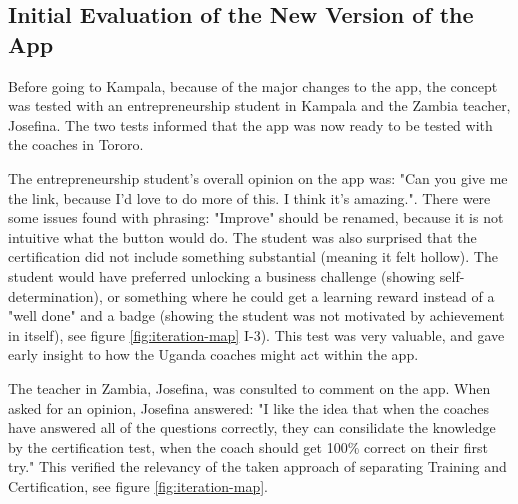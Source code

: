 


  \subsection{Initial Evaluation of the New Version of the App}
  Before going to Kampala, because of the major changes to the app, the concept was tested with an entrepreneurship student in Kampala and the Zambia teacher, Josefina. The two tests informed that the app was now ready to be tested with the coaches in Tororo.

  The entrepreneurship student's overall opinion on the app was: "Can you give me the link, because I'd love to do more of this. I think it's amazing.". There were some issues found with phrasing: "Improve" should be renamed, because it is not intuitive what the button would do. The student was also surprised that the certification did not include something substantial (meaning it felt hollow). The student would have preferred unlocking a business challenge (showing self-determination), or something where he could get a learning reward instead of a "well done" and a badge (showing the student was not motivated by achievement in itself), see figure \ref{fig:iteration-map} I-3). This test was very valuable, and gave early insight to how the Uganda coaches might act within the app.

  The teacher in Zambia, Josefina, was consulted to comment on the app. When asked for an opinion, Josefina answered: "I like the idea that when the coaches have answered all of the questions correctly, they can consilidate the knowledge by the certification test, when the coach should get 100\% correct on their first try." This verified the relevancy of the taken approach of separating Training and Certification, see figure \ref{fig:iteration-map}.
